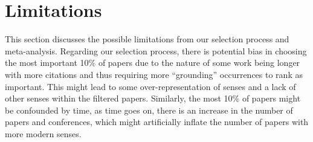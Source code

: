 \documentclass[11pt]{article}
\begin{document}








\section*{Limitations}
This section discusses the possible limitations from our selection process and meta-analysis. Regarding our selection process, there is potential bias in choosing the most important 10\% of papers due to the nature of some work being longer with more citations and thus requiring more ``grounding'' occurrences to rank as important. This might lead to some over-representation of senses and a lack of other senses within the filtered papers. Similarly, the most 10\% of papers might be confounded by time, as time goes on, there is an increase in the number of papers and conferences, which might artificially inflate the number of papers with more modern senses.
\end{document}
